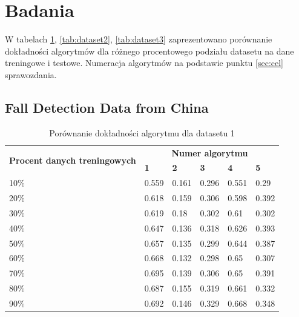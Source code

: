 \documentclass[a4paper,11pt]{article}
\begin{document}
\section{Badania}
W tabelach \ref{tab:dataset1}, \ref{tab:dataset2}, \ref{tab:dataset3} zaprezentowano porównanie dokładności algorytmów dla różnego procentowego podziału datasetu na dane treningowe i testowe. Numeracja algorytmów na podstawie punktu \ref{sec:cel} sprawozdania.

\subsection{Fall Detection Data from China}
\begin{table}[H]
\centering
\begin{tabular}{|l|l|l|l|l|l|}
\hline
\multicolumn{1}{|c|}{\multirow{2}{*}{\textbf{Procent danych treningowych}}} & \multicolumn{5}{c|}{\textbf{Numer algorytmu}}                       \\ \cline{2-6}
\multicolumn{1}{|c|}{}                                                      & \textbf{1} & \textbf{2} & \textbf{3} & \textbf{4} & \textbf{5} \\ \hline
10\%                                                                        & 0.559       & 0.161       & 0.296       & 0.551       & 0.29        \\ \hline
20\%                                                                        & 0.618       & 0.159       & 0.306       & 0.598       & 0.392       \\ \hline
30\%                                                                        & 0.619       & 0.18        & 0.302       & 0.61        & 0.302       \\ \hline
40\%                                                                        & 0.647       & 0.136       & 0.318       & 0.626       & 0.393       \\ \hline
50\%                                                                        & 0.657       & 0.135       & 0.299       & 0.644       & 0.387       \\ \hline
60\%                                                                        & 0.668       & 0.132       & 0.298       & 0.65        & 0.307       \\ \hline
70\%                                                                        & 0.695       & 0.139       & 0.306       & 0.65        & 0.391       \\ \hline
80\%                                                                        & 0.687       & 0.155       & 0.319       & 0.661       & 0.332       \\ \hline
90\%                                                                        & 0.692       & 0.146       & 0.329       & 0.668       & 0.348       \\ \hline
\end{tabular}
\caption{Porównanie dokładności algorytmu dla datasetu 1}
\label{tab:dataset1}
\end{table}
\end{document}
